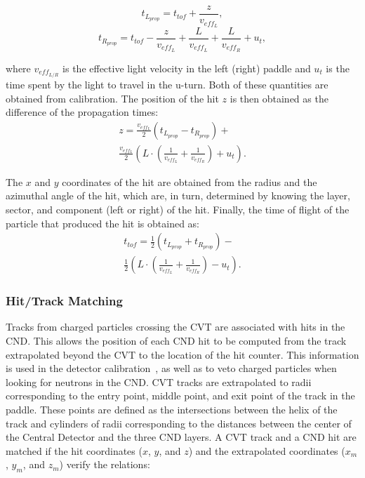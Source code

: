\begin{equation}
t_{L_{prop}} = t_{tof} + \frac{z}{v_{eff_L}},
\end{equation}
\begin{equation}
t_{R_{prop}} = t_{tof} - \frac{z}{v_{eff_L}} + \frac{L}{v_{eff_L}} + \frac{L}{v_{eff_R}} + u_t,
\end{equation}

\noindent
where $v_{eff_{L/R}}$ is the effective light velocity in the left (right) paddle and $u_t$ is the time spent by the light
to travel in the u-turn. Both of these quantities are obtained from calibration. The position of the hit $z$ is then
obtained as the difference of the propagation times:
\begin{multline}
  z = \frac{v_{eff_L}}{2} \left(t_{L_{prop}} - t_{R_{prop}} \right) + \\ \frac{v_{eff_L}}{2} \left( L \cdot \left(\frac{1}{v_{eff_L}}
  + \frac{1}{v_{eff_R}}\right) + u_t \right).
\end{multline}

The $x$ and $y$ coordinates of the hit are obtained from the radius and the azimuthal angle of the hit, which are,
in turn, determined by knowing the layer, sector, and component (left or right) of the hit. Finally, the time of flight
of the particle that produced the hit is obtained as:
\begin{multline}
  t_{tof} = \frac{1}{2} \left( t_{L_{prop}} + t_{R_{prop}} \right) - \\
  \frac{1}{2} \left( L \cdot \left( \frac{1}{v_{eff_L}} + \frac{1}{v_{eff_R}} \right)
  -u_t \right).
\end{multline}

\subsubsection{Hit/Track Matching}

Tracks from charged particles crossing the CVT are associated with hits in the CND. This allows the position of
each CND hit to be computed from the track extrapolated beyond the CVT to the location of the hit counter.
This information is used in the detector calibration~\cite{cnd-nim}, as well as to veto charged particles when looking
for neutrons in the CND. CVT tracks are extrapolated to radii corresponding to the entry point, middle point, and
exit point of the track in the paddle. These points are defined as the intersections between the helix of the track
and cylinders of radii corresponding to the distances between the center of the Central Detector and the three
CND layers. A CVT track and a CND hit are matched if the hit coordinates ($x$, $y$, and $z$) and the extrapolated
coordinates ($x_m$, $y_m$, and $z_m$) verify the relations:


